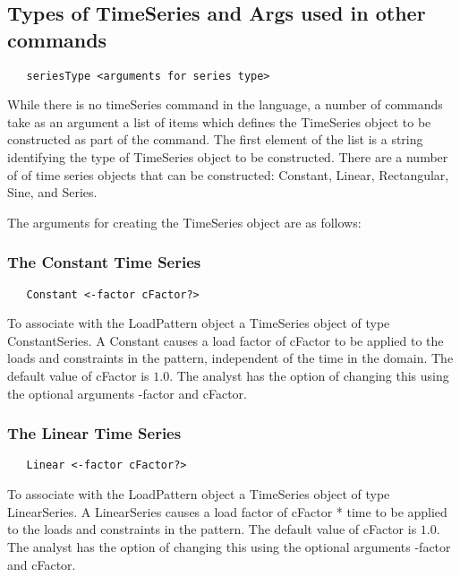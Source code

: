 \documentclass[12pt]{article}
\begin{document}
\subsection{Types of TimeSeries and Args used in other commands}

{\sf\small
\begin{verbatim}
   seriesType <arguments for series type>
\end{verbatim}
}


While there is no timeSeries command in the language, a number of
commands take as an argument a list of items which defines 
the TimeSeries object to be constructed as part of the command. The
first element of the list is a string identifying the type of
TimeSeries object to be constructed. There are a number of of
time series objects that can be constructed: 
Constant, Linear, Rectangular, Sine, and Series. 

The arguments for creating the TimeSeries object are as
follows: 

\subsubsection{The Constant Time Series}

{\sf\small
\begin{verbatim}
   Constant <-factor cFactor?> 
\end{verbatim}
}

\noindent To associate with the LoadPattern object a TimeSeries object
of type ConstantSeries. A Constant causes a load factor of cFactor to
be applied to the loads and constraints in the pattern, independent of
the time in the domain. The default value of cFactor is $1.0$. The
analyst has the option of changing this using the optional arguments
-factor and cFactor. 

\subsubsection{The Linear Time Series}

{\sf\small
\begin{verbatim}
   Linear <-factor cFactor?> 
\end{verbatim}
}

\noindent To associate with the LoadPattern object a TimeSeries object
of type LinearSeries. A LinearSeries causes a load factor of cFactor *
time to be applied to the loads and constraints in the pattern. The
default value of cFactor is $1.0$. The analyst has the option of
changing this using the optional arguments -factor and cFactor. 
\end{document}
